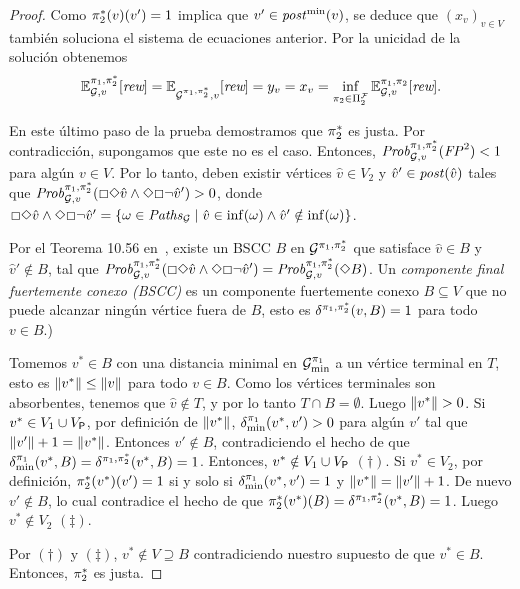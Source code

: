 \begin{proof}
  Como $\pi^*_{2}(v)(v') = 1$ implica que $v'\in\mathit{post}^{\min}(v)$,
  se deduce que $(x_v)_{v\in V}$ también soluciona el sistema de ecuaciones anterior.  Por la unicidad de la solución obtenemos
  \[\mathbb{E}^{\pi_{1}, \pi^*_{2}}_{\mathcal{G},v}[\textit{rew}] = 
    \mathbb{E}^{}_{\mathcal{G}^{\pi_{1},\pi^*_{2}},v}[\textit{rew}] =
    y_v = x_v =
    \inf_{\pi_{2} \in \Pi^{\mathcal{F}}_{2}} \mathbb{E}^{\pi_{1}, \pi_{2}}_{\mathcal{G},v}[\textit{rew}].
  \]

  En este último paso de la prueba demostramos que $\pi^*_{2}$ es justa.
  Por contradicción, supongamos que este no es el caso.  Entonces,
  $\mathit{Prob}^{\pi_{1}, \pi^*_{2}}_{\mathcal{G},v}(\mathit{FP}^2) < 1$ para algún
  $v\in V$.  Por lo tanto, deben existir vértices $\hat{v}\in V_2$
  y $\hat{v}'\in\mathit{post}(\hat{v})$ tales que 
  $\mathit{Prob}^{\pi_{1}, \pi^*_{2}}_{\mathcal{G},v}({\Box\Diamond\hat{v}}\land{\Diamond\Box\neg\hat{v}'})>0$,
  donde
  ${\Box\Diamond\hat{v}}\land{\Diamond\Box\neg\hat{v}'} =\{ {\omega\in\mathit{Paths}_{\mathcal{G}}} \mid {\hat{v} \in \inf(\omega)} \land {\hat{v}' \notin \inf(\omega)} \}$.

  Por el Teorema 10.56 en~\cite{BaierK08}, existe un BSCC
  $B$ en $\mathcal{G}^{\pi_{1},\pi^*_{2}}$ que satisface $\hat{v}\in
  B$ y $\hat{v}'\notin B$, tal que
  $\mathit{Prob}^{\pi_{1}, \pi^*_{2}}_{\mathcal{G},v}({\Box\Diamond\hat{v}}\land{\Diamond\Box\neg\hat{v}'})
  = \mathit{Prob}^{\pi_{1}, \pi^*_{2}}_{\mathcal{G},v}({\Diamond B})$.
%
  Un \emph{componente final fuertemente conexo (BSCC)} es un componente fuertemente conexo $B\subseteq V$ que no puede alcanzar ningún vértice fuera de $B$, esto es $\delta^{\pi_{1},\pi^*_{2}}(v,B)=1$
  para todo $v\in B$.)

  Tomemos $v^*\in B$ con una distancia minimal en
  $\mathcal{G}^{\pi_{1}}_{\min}$ a un vértice terminal en $T$, esto es
  ${\lVert{v^*}\rVert}\leq{\lVert{v}\rVert}$ para todo $v\in B$.  Como los vértices terminales son absorbentes, tenemos que $\hat{v}\notin T$, y por lo tanto
  $T\cap B=\emptyset$.  Luego ${\lVert{v^*}\rVert}>0$.
  Si $v^*\in V_1 \cup V_{\mathsf{P}}$, por definición de
  ${\lVert{v^*}\rVert}$, $\delta^{\pi_{1}}_{\min}(v^*,v')>0$
  para algún $v'$ tal que ${\lVert{v'}\rVert}+1={\lVert{v^*}\rVert}$. Entonces
  $v'\notin B$, contradiciendo el hecho de que
  $\delta^{\pi_{1}}_{\min}(v^*,B)=\delta^{\pi_{1},\pi^*_{2}}(v^*,B)=1$.
  Entonces, $v^*\notin V_1 \cup V_{\mathsf{P}}$ $(\dagger)$.
  Si $v^*\in V_2$, por definición,
  $\pi^*_{2}(v^*)(v')=1$ si y solo si
  $\delta^{\pi_{1}}_{\min}(v^*,v')=1$ y
  ${\lVert{v^*}\rVert}={\lVert{v'}\rVert}+1$. De nuevo $v'\notin B$, 
  lo cual contradice el hecho de que
  $\pi^*_{2}(v^*)(B)=\delta^{\pi_{1},\pi^*_{2}}(v^*,B)=1$.
  Luego $v^*\notin V_2$ $(\ddagger)$.
  
  Por $(\dagger)$ y $(\ddagger)$, $v^*\notin V \supseteq B$
  contradiciendo nuestro supuesto de que $v^*\in B$.  Entonces,
  $\pi^*_{2}$ es justa.
  \qedhere
\end{proof}

